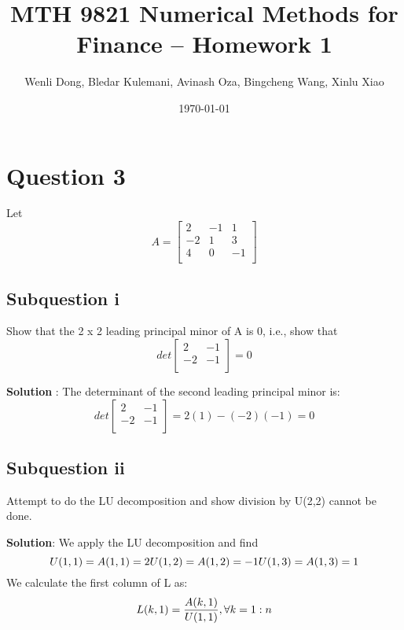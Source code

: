 \documentclass{article}
\title{MTH 9821 Numerical Methods for Finance -- Homework 1}
\author{Wenli Dong, Bledar Kulemani, Avinash Oza, Bingcheng Wang, Xinlu Xiao}
\date{\today}
\DeclareMathOperator{\1}{\mathit{1}}
\numberwithin{figure}{section} %
\begin{document}
\maketitle
\section{Question 3}
Let 
    \[
        A = 
        \begin{bmatrix}
            2 & -1 & 1 \\
            -2 & 1 & 3 \\
            4 & 0 & -1 \\
        \end{bmatrix}
    \]

\subsection{Subquestion i} 
Show that the 2 x 2 leading principal minor of A is 0, i.e., show that
    \[
        det \begin{bmatrix}
            2 & -1 \\
            -2 & -1 \\
        \end{bmatrix}  = 0
    \]

\textbf{Solution} : The determinant of the second leading principal minor is:
    \[
        det \begin{bmatrix}
            2 & -1 \\
            -2 & -1 \\
        \end{bmatrix}  = 2(1) - (-2)(-1) = 0
    \]

\subsection{Subquestion ii} 
Attempt to do the LU decomposition and show division by U(2,2) cannot be done.

\textbf{Solution}: We apply the LU decomposition and find 
    \[
        U(1,1) = A(1,1) = 2 \\
        U(1,2) = A(1,2) = -1 \\
        U(1,3) = A(1,3) = 1 \\
    \]
We calculate the first column of L as:
    \[
        L(k,1) = \frac{A(k,1)}{U(1,1)}, \forall k = 1:n \\ 
    \]
\end{document}
